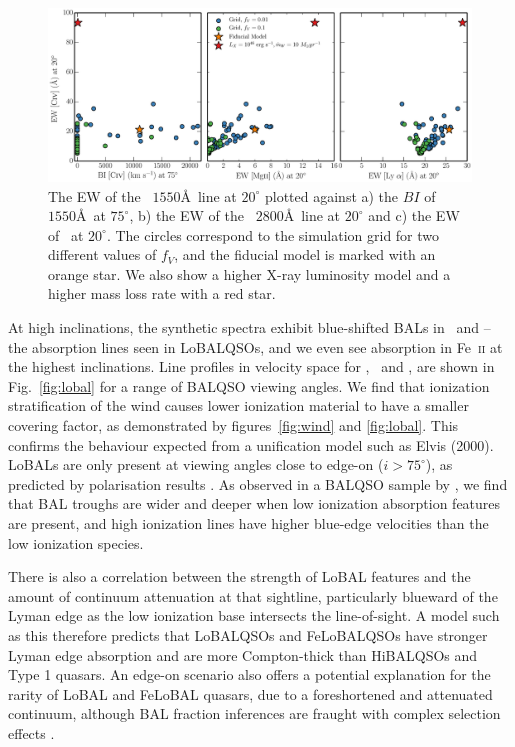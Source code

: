 \documentclass[useAMS,usenatbib]{mn2e_x}
\begin{document}
\begin{figure}
\centering
\includegraphics[width=1.0\textwidth]{figures/fig8.eps}
\caption
{
The EW of the \civ~$1550$\AA\ line at $20^\circ$ plotted against a) the 
$BI$ of \civ~$1550$\AA\ at $75^\circ$, b) the EW of the \mg~$2800$\AA\ line 
at $20^\circ$ and c) the EW of \la\ at $20^\circ$. The circles correspond 
to the simulation grid for two different values of $f_V$, and the fiducial 
model is marked with an orange star. 
We also show a higher X-ray luminosity model and a higher mass loss rate
with a red star.
}
\label{fig:grid}
\end{figure}

At high inclinations, the synthetic spectra exhibit blue-shifted BALs in \al\ and \mg --
the absorption lines seen in LoBALQSOs, and we even see absorption in Fe~\textsc{ii}
at the highest inclinations. Line profiles in velocity space 
for \civ, \al\ and \mg, are shown in Fig.~\ref{fig:lobal} for a range
of BALQSO viewing angles. We find that ionization stratification
of the wind causes lower ionization material to have a smaller covering factor, 
as demonstrated by figures~\ref{fig:wind} and \ref{fig:lobal}.
This confirms the behaviour expected from a unification model such as Elvis (2000). 
LoBALs are only present at viewing angles close to edge-on ($i>75^\circ$),
as predicted by polarisation results \citep{brotherton1997}.
As observed in a BALQSO sample by \cite{filizak2014}, we find that
BAL troughs are wider and deeper when low ionization absorption features are present,
and high ionization lines have higher blue-edge velocities than the 
low ionization species. 

There is also a correlation between the strength of LoBAL features
and the amount of continuum attenuation at that sightline, particularly
blueward of the Lyman edge as the low ionization base 
intersects the line-of-sight. 
A model such as this therefore predicts that LoBALQSOs and FeLoBALQSOs 
have stronger Lyman edge absorption and 
are more Compton-thick than HiBALQSOs and Type 1 quasars.
An edge-on scenario also offers a potential explanation for the rarity of LoBAL and
FeLoBAL quasars, due to a foreshortened and attenuated continuum, 
although BAL fraction inferences are fraught with complex selection 
effects \citep{goodrich1997,krolikvoit1998}.
\end{document}
